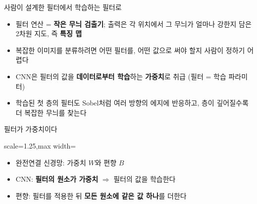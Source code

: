 \documentclass[aspectratio=169,11pt]{beamer}
\def\cellsz{0.5}%
\newcommand{\numgrid}[4]{%
  \foreach \v [count=\k from 0] in {#4} {%
    \pgfmathtruncatemacro{\rr}{int(\k/#3)}%
    \pgfmathtruncatemacro{\cc}{mod(\k,#3)}%
    \draw[black!55] ({#1+\cc*\cellsz},{#2-\rr*\cellsz}) rectangle ++(\cellsz,-\cellsz);%
    \node[font=\small] at ({#1+\cc*\cellsz+0.5*\cellsz},{#2-\rr*\cellsz-0.5*\cellsz}) {\v};%
  }}
\begin{document}
\begin{frame}{사람이 설계한 필터에서 학습하는 필터로}
\begin{keybox}
\begin{itemize}
\item 필터 연산 = \textbf{작은 무늬 검출기}; 출력은 각 위치에서 그 무늬가 얼마나 강한지 담은 2차원 지도, 즉 \textbf{특징 맵}
\item 복잡한 이미지를 분류하려면 어떤 필터를, 어떤 값으로 써야 할지 사람이 정하기 어렵다
\item CNN은 필터의 값을 \textbf{데이터로부터 학습}하는 \textbf{가중치}로 취급 (필터 = 학습 파라미터)
\item 학습된 첫 층의 필터도 Sobel처럼 여러 방향의 에지에 반응하고, 층이 깊어질수록 더 복잡한 무늬를 찾는다
\end{itemize}
\end{keybox}
\end{frame}

\begin{frame}{필터가 가중치이다}
\centering
\begin{adjustbox}{scale=1.25,max width=\linewidth}
\end{adjustbox}
\raggedright
\vskip3mm
\begin{itemize}
\item 완전연결 신경망: 가중치 $W$와 편향 $B$
\item CNN: \textbf{필터의 원소가 가중치} $\Rightarrow$ 필터의 값을 학습한다
\item 편향: 필터를 적용한 뒤 \textbf{모든 원소에 같은 값 하나}를 더한다
\end{itemize}
\end{frame}
\end{document}
